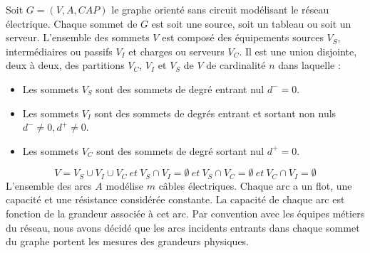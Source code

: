 
Soit $G=(V,A,CAP)$ le graphe orient\'e sans circuit mod\'elisant le r\'eseau \'electrique. 
Chaque sommet de $G$ est soit une source, soit  un tableau ou soit un serveur. 
L'ensemble des sommets $V$ est compos\'e des \'equipements sources $V_S$, interm\'ediaires ou passifs $V_I$ et  charges ou serveurs $V_C$. Il est une union disjointe, deux \`a deux, des partitions $V_C$, $V_I$ et $V_S$ de $V$ de cardinalit\'e $n$ dans laquelle :
\begin{itemize}
	\item Les sommets $V_S$ sont des sommets de degr\'e entrant nul $d^{-} = 0$.
	\item Les sommets $V_I$ sont des sommets de degr\'es entrant et sortant non nuls $d^{-} \ne 0, d^{+} \ne 0$.  
	\item Les sommets $V_C$ sont des sommets de degr\'e sortant nul  $d^{+} = 0$.
\end{itemize}
$$ 
V = V_S \cup V_I \cup V_C ~ et ~ 
V_S \cap V_I =  \emptyset ~ et ~ 
V_S \cap V_C =  \emptyset ~ et ~ 
V_C \cap V_I =  \emptyset
$$
L'ensemble des arcs $A$ mod\'elise $m$ c\^ables \'electriques.
Chaque arc a un flot, une capacit\'e et une r\'esistance consid\'er\'ee constante.
La capacit\'e de chaque arc est fonction de la grandeur associ\'ee \`a cet arc.
\newline
Par convention avec les \'equipes m\'etiers du r\'eseau, nous avons d\'ecid\'e que les arcs incidents entrants dans chaque sommet du graphe portent les mesures des grandeurs physiques.
